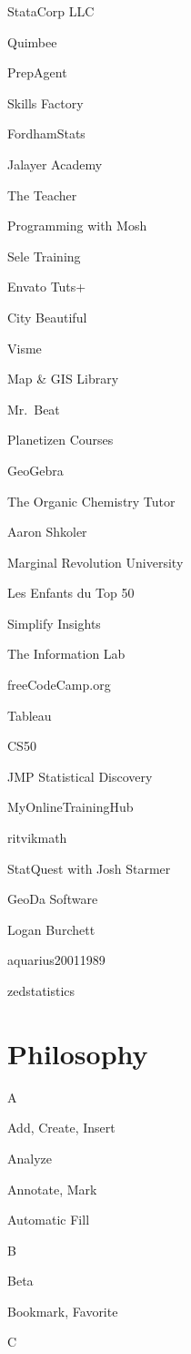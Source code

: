 \documentclass[
]{book}
\begin{document}
StataCorp LLC

Quimbee

PrepAgent

Skills Factory

FordhamStats

Jalayer Academy

The Teacher

Programming with Mosh

Sele Training

Envato Tuts+

City Beautiful

Visme

Map \& GIS Library

Mr.~Beat

Planetizen Courses

GeoGebra

The Organic Chemistry Tutor

Aaron Shkoler

Marginal Revolution University

Les Enfants du Top 50

Simplify Insights

The Information Lab

freeCodeCamp.org

Tableau

CS50

JMP Statistical Discovery

MyOnlineTrainingHub

ritvikmath

StatQuest with Josh Starmer

GeoDa Software

Logan Burchett

aquarius20011989

zedstatistics

\hypertarget{philosophy}{%
\chapter{Philosophy}\label{philosophy}}

A

Add, Create, Insert

Analyze

Annotate, Mark

Automatic Fill

B

Beta

Bookmark, Favorite

C
\end{document}
